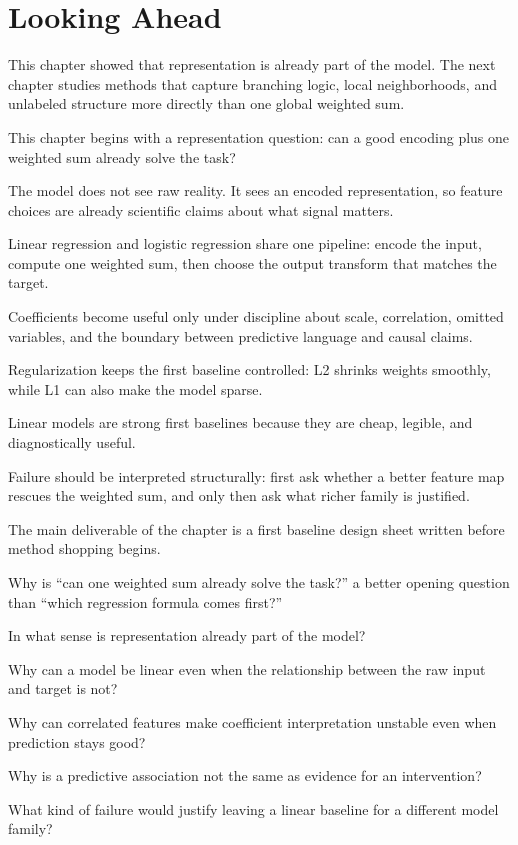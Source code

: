 \section{Looking Ahead}

This chapter showed that representation is already part of the model. The next chapter studies methods that capture branching logic, local neighborhoods, and unlabeled structure more directly than one global weighted sum.

\begin{chaptersummary}
\item This chapter begins with a representation question: can a good encoding plus one weighted sum already solve the task?
\item The model does not see raw reality. It sees an encoded representation, so feature choices are already scientific claims about what signal matters.
\item Linear regression and logistic regression share one pipeline: encode the input, compute one weighted sum, then choose the output transform that matches the target.
\item Coefficients become useful only under discipline about scale, correlation, omitted variables, and the boundary between predictive language and causal claims.
\item Regularization keeps the first baseline controlled: L2 shrinks weights smoothly, while L1 can also make the model sparse.
\item Linear models are strong first baselines because they are cheap, legible, and diagnostically useful.
\item Failure should be interpreted structurally: first ask whether a better feature map rescues the weighted sum, and only then ask what richer family is justified.
\item The main deliverable of the chapter is a first baseline design sheet written before method shopping begins.
\end{chaptersummary}

\begin{studyquestions}
\item Why is ``can one weighted sum already solve the task?'' a better opening question than ``which regression formula comes first?'' 
\item In what sense is representation already part of the model?
\item Why can a model be linear even when the relationship between the raw input and target is not?
\item Why can correlated features make coefficient interpretation unstable even when prediction stays good?
\item Why is a predictive association not the same as evidence for an intervention?
\item What kind of failure would justify leaving a linear baseline for a different model family?
\end{studyquestions}

